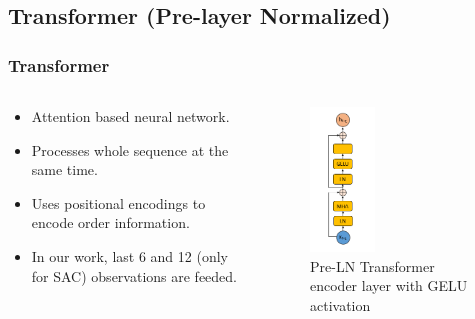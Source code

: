 \documentclass{beamer}
\begin{document}
\subsection{Transformer (Pre-layer Normalized)}
\begin{frame}
\frametitle{Transformer}
\begin{columns}[onlytextwidth]
	\begin{column}{.49\textwidth}
		\begin{itemize}
			\item Attention based neural network.
			\item Processes whole sequence at the same time.
			\item Uses positional encodings to encode order information.
			\item In our work, last 6 and 12 (only for SAC) observations are feeded. 			
		\end{itemize}
	\end{column}
	\begin{column}{.49\textwidth}
		\begin{figure}
			\centering
			\includegraphics[width=0.4\textwidth]{figures/ml_theory/transformer_block.png}
			\caption{Pre-LN Transformer encoder layer with GELU activation}
			\label{fig:pre_trsf}
		\end{figure}
	\end{column}
\end{columns}
\end{frame}
\end{document}
